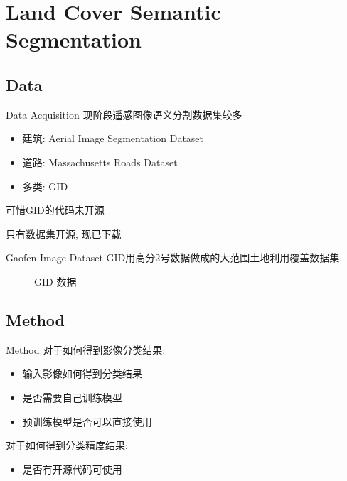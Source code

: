 \section{Land Cover Semantic Segmentation}

\subsection{Data}
\begin{frame}{Data Acquisition}
    现阶段遥感图像语义分割数据集较多

    \begin{itemize}
        \item 建筑: Aerial Image Segmentation Dataset
        \item 道路: Massachusetts Roads Dataset
        \item 多类: GID
    \end{itemize}

    可惜GID的代码未开源
    
    只有数据集开源, 现已下载

\end{frame}

\begin{frame}{Gaofen Image Dataset}
    GID用高分2号数据做成的大范围土地利用覆盖数据集.

    \begin{figure}[!htbp]
        \centering
        \quad
        \caption{GID 数据}
        \label{fig:0201}
    \end{figure}
    
\end{frame}

\subsection{Method}
\begin{frame}{Method}
    对于如何得到影像分类结果:
    \begin{itemize}
        \item 输入影像如何得到分类结果
        \item 是否需要自己训练模型
        \item 预训练模型是否可以直接使用
    \end{itemize}    
    对于如何得到分类精度结果:
    \begin{itemize}
        \item 是否有开源代码可使用
    \end{itemize}
\end{frame}